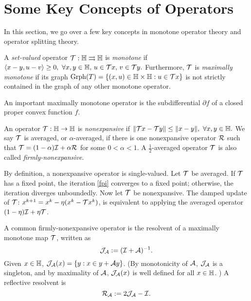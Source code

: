 \section{Some Key Concepts of Operators}\label{sec:op-concept}
In this section, we go over a few key concepts in monotone operator theory and operator splitting theory.

\begin{definition}\label{def:max-mon-op}
A \emph{set-valued} operator ${\mathcal{T}}:\mathbb{H}\rightrightarrows\mathbb{H}$ is \emph{monotone} if
$\langle x-y, u-v\rangle\ge 0,\ \forall x,y\in\mathbb{H},\, u\in {\mathcal{T}} x,\, v\in{\mathcal{T}} y.$
Furthermore, ${\mathcal{T}}$ is \emph{maximally monotone} if its graph $\mathrm{Grph}(T)=\{(x,u)\in \mathbb{H}\times\mathbb{H}: u\in {\mathcal{T}} x\}$ is not strictly contained in the graph of any other monotone operator. 
\end{definition}

\begin{example}\label{exmp:mon-op}
An important maximally monotone operator is the subdifferential $\partial f$ of a closed proper convex function $f$.
\end{example}

\begin{definition}
An operator ${\mathcal{T}}:\mathbb{H}\to\mathbb{H}$ is \emph{nonexpansive} if
$\|{\mathcal{T}} x-{\mathcal{T}} y\|\le\|x-y\|,\ \forall x, y\in\mathbb{H}.$ We say ${\mathcal{T}}$ is averaged, or $\alpha$-averaged, if there is one nonexpansive operator ${\mathcal{R}}$ such that ${\mathcal{T}}=(1-\alpha){\mathcal{I}}+\alpha{\mathcal{R}}$ for some $0<\alpha<1$.  A $\frac{1}{2}$-averaged operator ${\mathcal{T}}$ is also called \emph{firmly-nonexpansive}.
\end{definition}
By definition, a nonexpansive operator is single-valued. Let ${\mathcal{T}}$ be averaged. If ${\mathcal{T}}$ has a fixed point, the iteration \eqref{fpi} converges to a fixed point; otherwise, the iteration diverges unboundedly. Now let  ${\mathcal{T}}$ be nonexpansive. The damped update of ${\mathcal{T}}$: $x^{k+1} = x^k-\eta(x^k- {\mathcal{T}} x^k)$, is equivalent to applying the averaged operator $(1-\eta){\mathcal{I}}+\eta{\mathcal{T}}$. 

\begin{example}
A common firmly-nonexpansive operator is the resolvent of a maximally monotone map ${\mathcal{T}}$, written as 
\begin{equation}\label{def-resolvent}\cJ_\cA := (\cI+\cA)^{-1}.
\end{equation} Given $x\in\mathbb{H}$, ${\mathcal{J}}_{\mathcal{A}}(x) =  \{y:x\in y+{\mathcal{A}} y\}$. (By monotonicity of ${\mathcal{A}}$, ${\mathcal{J}}_{\mathcal{A}}$ is a singleton, and by maximality of ${\mathcal{A}}$, ${\mathcal{J}}_{\mathcal{A}}(x)$ is well defined for all $x\in\mathbb{H}$. ) A reflective resolvent is \begin{equation}\label{def-ref}\cR_{\cA}:= 2\cJ_\cA-\cI.
\end{equation}
\end{example}


